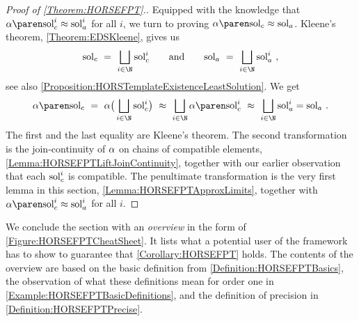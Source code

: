 \documentclass[../../diss.tex]{subfiles}
\begin{document}
\begin{proof}[Proof of \cref{Theorem:HORSEFPT}.]
    Equipped with the knowledge that $\abs{\solci{i}} \approx \solai{i}$ for all $i$, we turn to proving $\abs{\solc} \approx \sola$.
    Kleene's theorem, \cref{Theorem:EDSKleene}, gives us
    \[
        \solc \ = \ \bigsqcup_{i \in \N} \solci{i}
        \qquad \text{and}
        \qquad
        \sola \ = \ \bigsqcup_{i \in \N} \solai{i}
        \ ,
    \]
    see also \cref{Proposition:HORSTemplateExistenceLeastSolution}.
    We get
    \begin{align*}
        \abs{\solc}
        \ = \
        \abs \big( \bigsqcup_{i \in \N} \solci{i} \big)
        \ \approx \
        \bigsqcup_{i \in \N} \abs{\solci{i}}
        \ \approx \
        \bigsqcup_{i \in \N} \solai{i}
        =
        \sola
        \ .
    \end{align*}
    The first and the last equality are Kleene's theorem.
    The second transformation is the join-continuity of $\abs$ on chains of compatible elements, \cref{Lemma:HORSEFPTLiftJoinContinuity}, together with our earlier observation that each $\text{sol}_{c}^{i}$ is compatible.
    The penultimate transformation is the very first lemma in this section, \cref{Lemma:HORSEFPTApproxLimits}, together with $\abs{\solci{i}} \approx \solai{i}$ for all $i$.
\end{proof}

We conclude the section with an \emph{overview} in the form of \cref{Figure:HORSEFPTCheatSheet}.
It lists what a potential user of the framework has to show to guarantee that \cref{Corollary:HORSEFPT} holds.
The contents of the overview are based on the basic definition from \cref{Definition:HORSEFPTBasics}, the observation of what these definitions mean for order one in \cref{Example:HORSEFPTBasicDefinitions}, and the definition of precision in \cref{Definition:HORSEFPTPrecise}.
\end{document}
